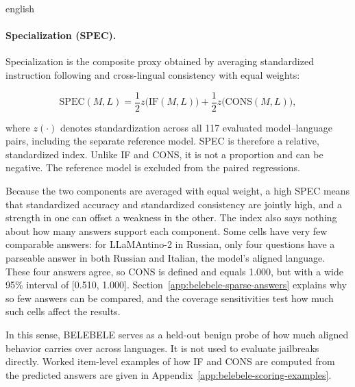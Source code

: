 \begin{otherlanguage*}{english}
\paragraph*{Specialization (SPEC).}
Specialization is the composite proxy obtained by averaging standardized instruction following and cross-lingual consistency with equal weights:


\begin{equation}
\mathrm{SPEC}(M,L) = \frac{1}{2} z\bigl(\mathrm{IF}(M,L)\bigr) + \frac{1}{2} z\bigl(\mathrm{CONS}(M,L)\bigr),
\label{eq:spec-score}
\end{equation}

where $z(\cdot)$ denotes standardization across all 117 evaluated model--language pairs, including the separate reference model. SPEC is therefore a relative, standardized index. Unlike IF and CONS, it is not a proportion and can be negative. The reference model is excluded from the paired regressions.

Because the two components are averaged with equal weight, a high SPEC means that standardized accuracy and standardized consistency are jointly high, and a strength in one can offset a weakness in the other. The index also says nothing about how many answers support each component. Some cells have very few comparable answers: for LLaMAntino-2 in Russian, only four questions have a parseable answer in both Russian and Italian, the model's aligned language. These four answers agree, so CONS is defined and equals 1.000, but with a wide 95\% interval of [0.510, 1.000]. Section~\ref{app:belebele-sparse-answers} explains why so few answers can be compared, and the coverage sensitivities test how much such cells affect the results.

In this sense, BELEBELE serves as a held-out benign probe of how much aligned behavior carries over across languages. It is not used to evaluate jailbreaks directly. Worked item-level examples of how IF and CONS are computed from the predicted answers are given in Appendix~\ref{app:belebele-scoring-examples}.




\end{otherlanguage*}
